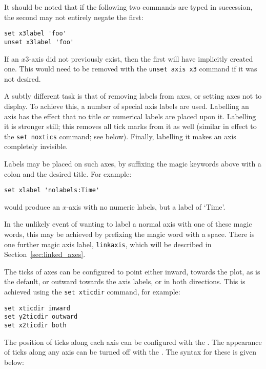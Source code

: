 It should be noted that if the following two commands are typed in succession,
the second may not entirely negate the first:

\begin{verbatim}
set x3label 'foo'
unset x3label 'foo'
\end{verbatim}

\noindent If an $x3$-axis did not previously exist, then the first will have
implicitly created one. This would need to be removed with the {\tt unset axis
x3} command if it was not desired.

A subtly different task is that of removing labels from axes, or setting axes
not to display. To achieve this, a number of special axis labels are used.
Labelling an axis  has the effect that no title or numerical
labels are placed upon it. Labelling it  is stronger
still; this removes all tick marks from it as well (similar in effect to the
{\tt set noxtics} command; see below).  Finally, labelling it
 makes an axis completely invisible.

Labels may be placed on such axes, by suffixing the magic keywords above with a
colon and the desired title. For example:

\begin{verbatim}
set xlabel 'nolabels:Time'
\end{verbatim}

\noindent would produce an $x$-axis with no numeric labels, but a label of
`Time'.

In the unlikely event of wanting to label a normal axis with one of these magic
words, this may be
achieved by prefixing the magic word with a space. There is one further magic
axis label, {\tt linkaxis}, which will be described in
Section~\ref{sec:linked_axes}.

The ticks of axes can be configured to point either inward, towards the plot,
as is the default, or outward towards the axis labels, or in both directions.
This is achieved using the {\tt set xticdir} command, for example:

\begin{verbatim}
set xticdir inward
set y2ticdir outward
set x2ticdir both
\end{verbatim}

The position of ticks along each axis can be configured with the . The appearance of ticks along any axis can be turned off with the
. The syntax for these is given below:

